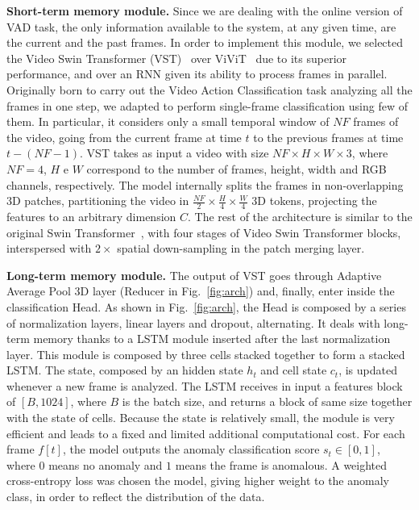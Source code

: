 \noindent\textbf{Short-term memory module.}
Since we are dealing with the online version of VAD task, the only information available to the system, at any given time, are the current and the past frames.
In order to implement this module, we selected the Video Swin Transformer (VST)~\cite{liu_video_2022} over ViViT~\cite{Arnab_2021_ICCV} due to its superior performance, and over an RNN given its ability to process frames in parallel.
Originally born to carry out the Video Action Classification task analyzing all the frames in one step, we adapted to perform single-frame classification using few of them.
In particular, it considers only a small temporal window of $\mathit{NF}$ frames of the video, going from the current frame at time $t$ to the previous frames at time $t-\left(\mathit{NF}-1\right)$.
VST takes as input a video with size $\mathit{NF} \times H \times W \times 3$, where $\mathit{NF = 4}$, $H$ e $W$ correspond to the number of frames, height, width and RGB channels, respectively.
The model internally splits the frames in non-overlapping 3D patches, partitioning the video in $\frac{\mathit{NF}}{2} \times \frac{H}{4} \times \frac{W}{4}$ 3D tokens, projecting the features to an arbitrary dimension $C$.
The rest of the architecture is similar to the original Swin Transformer~\cite{liu2021Swin}, with four stages of Video Swin Transformer blocks, interspersed with $2\times$ spatial down-sampling in the patch merging layer.

\noindent\textbf{Long-term memory module.}
The output of VST goes through Adaptive Average Pool 3D layer (Reducer in Fig.~\ref{fig:arch}) and, finally, enter inside the classification Head.
As shown in Fig.~\ref{fig:arch}, the Head is composed by a series of normalization layers, linear layers and dropout, alternating. 
It deals with long-term memory thanks to a LSTM module inserted after the last normalization layer.
This module is composed by three cells stacked together to form a stacked LSTM.
The state, composed by an hidden state $h_t$ and cell state $c_t$, is updated whenever a new frame is analyzed.
The LSTM receives in input a features block of $[B, 1024]$, where $B$ is the batch size, and returns a block of same size together with the state of cells.
Because the state is relatively small, the module is very efficient and leads to a fixed and limited additional computational cost.
For each frame $f[t]$, the model outputs the anomaly classification score $s_t \in [0,1]$, where $0$ means no anomaly and $1$ means the frame is anomalous.
A weighted cross-entropy loss was chosen the model, giving higher weight to the anomaly class, in order to reflect the distribution of the data.

